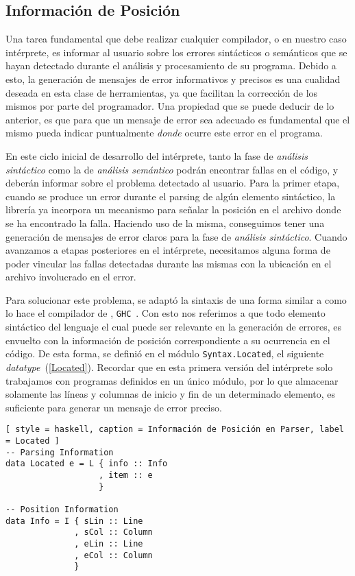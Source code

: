 \subsection{Información de Posición}

Una tarea fundamental que debe realizar cualquier compilador, o en nuestro caso intérprete, es informar al usuario sobre los errores sintácticos o semánticos que se hayan detectado durante el análisis y procesamiento de su programa.
Debido a esto, la generación de mensajes de error informativos y precisos es una cualidad deseada en esta clase de herramientas, ya que facilitan la corrección de los mismos por parte del programador.
Una propiedad que se puede deducir de lo anterior, es que para que un mensaje de error sea adecuado es fundamental que el mismo pueda indicar puntualmente \textit{donde} ocurre este error en el programa.

En este ciclo inicial de desarrollo del intérprete, tanto la fase de \textit{análisis sintáctico} como la de \textit{análisis semántico} podrán encontrar fallas en el código, y deberán informar sobre el problema detectado al usuario.
Para la primer etapa, cuando se produce un error durante el parsing de algún elemento sintáctico, la librería \Megaparsec{} ya incorpora un mecanismo para señalar la posición en el archivo donde se ha encontrado la falla.
Haciendo uso de la misma, conseguimos tener una generación de mensajes de error claros para la fase de \textit{análisis sintáctico}.
Cuando avanzamos a etapas posteriores en el intérprete, necesitamos alguna forma de poder vincular las fallas detectadas durante las mismas con la ubicación en el archivo involucrado en el error.

Para solucionar este problema, se adaptó la sintaxis de una forma similar a como lo hace el compilador de \Haskell{}, \texttt{GHC}~\cite{GHC}.
Con esto nos referimos a que todo elemento sintáctico del lenguaje el cual puede ser relevante en la generación de errores, es envuelto con la información de posición correspondiente a su ocurrencia en el código.
De esta forma, se definió en el módulo \lstinline[style = module]{Syntax.Located}, el siguiente \textit{datatype}~(\ref{Located}).
Recordar que en esta primera versión del intérprete solo trabajamos con programas definidos en un único módulo, por lo que almacenar solamente las líneas y columnas de inicio y fin de un determinado elemento, es suficiente para generar un mensaje de error preciso.

\begin{lstlisting}[ style = haskell, caption = Información de Posición en Parser, label = Located ]
-- Parsing Information
data Located e = L { info :: Info
                   , item :: e
                   }

-- Position Information
data Info = I { sLin :: Line
              , sCol :: Column
              , eLin :: Line
              , eCol :: Column
              }
\end{lstlisting}

